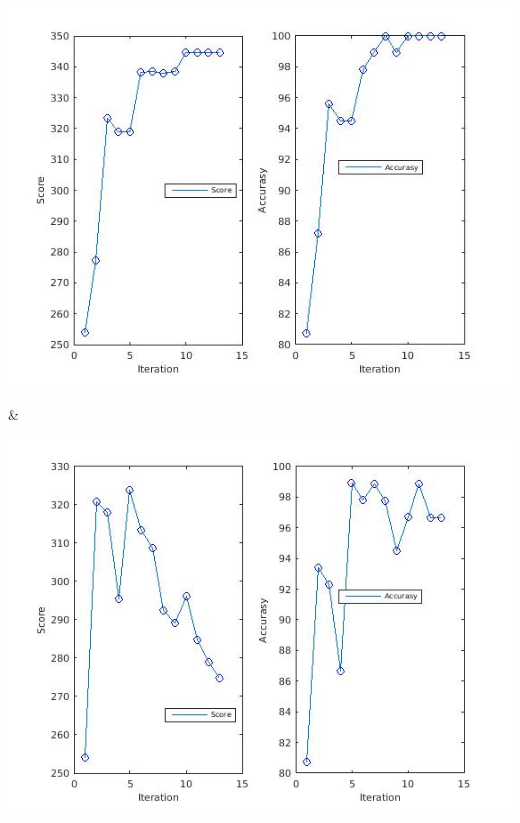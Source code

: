 \documentclass[
	fontsize=12pt,
	paper=a4,
	twoside=false,
	numbers=noenddot,
	plainheadsepline,
	toc=listof,
	toc=bibliography
]{scrartcl}
\begin{document}
\begin{landscape}
\begin{table}
\begin{tabular}
		\parbox[b]{1em}{
			\includegraphics[scale = 0.28]{fig/method1/test3/accuracy_LL.jpg}}  &
		\parbox[b]{1em}{
			\includegraphics[scale = 0.28]{fig/method2/test3/accuracy_LL.jpg}} \\
		\hline			
		
	\end{tabular}
\end{table}


\end{landscape}



	
\end{document}
